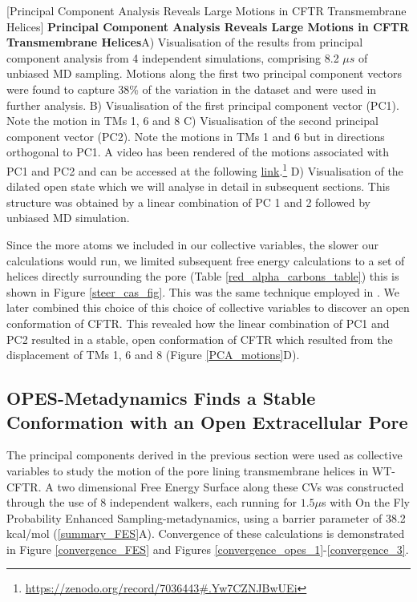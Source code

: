 	[Principal Component Analysis Reveals Large Motions in CFTR Transmembrane Helices] {\textbf{Principal Component Analysis Reveals Large Motions in CFTR Transmembrane Helices}}{A) Visualisation of the results from principal component analysis from 4 independent simulations, comprising 8.2 $\mu s$ of unbiased MD sampling. Motions along the first two principal component vectors were found to capture 38\% of the variation in the dataset and were used in further analysis. B) Visualisation of the first principal component vector (PC1). Note the motion in TMs 1, 6 and 8 C) Visualisation of the second principal component vector (PC2). Note the motions in TMs 1 and 6 but in directions orthogonal to PC1. A video has been rendered of the motions associated with PC1 and PC2 and can be accessed at the following \href{https://zenodo.org/record/7036443#.Yw7CZNJBwUE}{link}.\footnote{\href{https://zenodo.org/record/7036443\#.Yw7CZNJBwUEi}{https://zenodo.org/record/7036443\#.Yw7CZNJBwUEi}} D) Visualisation of the dilated open state which we will analyse in detail in subsequent sections. This structure was obtained by a linear combination of PC 1 and 2 followed by unbiased MD simulation. } 
	\label{PCA_motions}
	\endgroup

Since the more atoms we included in our collective variables, the slower our calculations would run, we limited subsequent free energy calculations to a set of helices directly surrounding the pore (Table \ref{red_alpha_carbons_table}) this is shown in Figure \ref{steer_cas_fig}. This was the same technique employed in \cite{hoffmann2018}. We later combined this choice of this choice of collective variables to discover an open conformation of CFTR. This revealed how the linear combination of PC1 and PC2 resulted in a stable, open conformation of CFTR which resulted from the displacement of TMs 1, 6 and 8 (Figure \ref{PCA_motions}D). 

\subsection{OPES-Metadynamics Finds a Stable Conformation with an Open Extracellular Pore}

The principal components derived in the previous section were used as collective variables to study the motion of the pore lining transmembrane helices in WT-CFTR. A two dimensional Free Energy Surface along these CVs was constructed through the use of 8 independent walkers, each running for $1.5\mu$s with On the Fly Probability Enhanced Sampling-metadynamics, using a barrier parameter of 38.2 kcal/mol (\ref{summary_FES}A). Convergence of these calculations is demonstrated in Figure \ref{convergence_FES} and Figures \ref{convergence_opes_1}-\ref{convergence_3}. 

